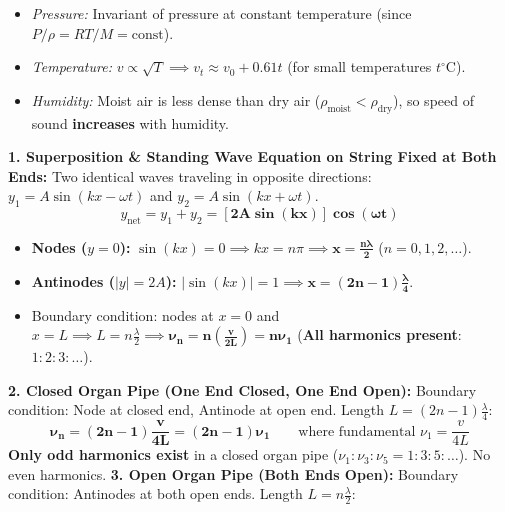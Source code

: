 \documentclass[10pt,a4paper]{article}
\begin{document}
\begin{formulabox}
\begin{itemize}
  \begin{itemize}
    \item \textit{Pressure:} Invariant of pressure at constant temperature (since $P/\rho = RT/M = \text{const}$).
    \item \textit{Temperature:} $v \propto \sqrt{T} \implies v_t \approx v_0 + 0.61 t$ (for small temperatures $t^\circ\mathrm{C}$).
    \item \textit{Humidity:} Moist air is less dense than dry air ($\rho_{\text{moist}} < \rho_{\text{dry}}$), so speed of sound \textbf{increases} with humidity.
  \end{itemize}
\end{itemize}
\end{formulabox}

\begin{formulabox}
\textbf{1. Superposition \& Standing Wave Equation on String Fixed at Both Ends:}
Two identical waves traveling in opposite directions: $y_1 = A\sin(kx - \omega t)$ and $y_2 = A\sin(kx + \omega t)$.
\begin{equation}
  y_{\text{net}} = y_1 + y_2 = \mathbf{[2A \sin(kx)] \cos(\omega t)}
\end{equation}
\begin{itemize}
  \item \textbf{Nodes ($y=0$):} $\sin(kx) = 0 \implies kx = n\pi \implies \mathbf{x = \frac{n\lambda}{2}}$ ($n = 0, 1, 2, \dots$).
  \item \textbf{Antinodes ($|y|=2A$):} $|\sin(kx)| = 1 \implies \mathbf{x = (2n-1)\frac{\lambda}{4}}$.
  \item Boundary condition: nodes at $x = 0$ and $x = L \implies L = n\frac{\lambda}{2} \implies \mathbf{\nu_n = n \left(\frac{v}{2L}\right) = n \nu_1}$ (\textbf{All harmonics present}: $1 : 2 : 3 : \dots$).
\end{itemize}
\textbf{2. Closed Organ Pipe (One End Closed, One End Open):}
Boundary condition: Node at closed end, Antinode at open end. Length $L = (2n-1)\frac{\lambda}{4}$:
\begin{equation}
  \mathbf{\nu_n = (2n-1)\frac{v}{4L} = (2n-1)\nu_1} \qquad \text{where fundamental } \nu_1 = \frac{v}{4L}
\end{equation}
\textbf{Only odd harmonics exist} in a closed organ pipe ($\nu_1 : \nu_3 : \nu_5 = 1 : 3 : 5 : \dots$). No even harmonics.
\textbf{3. Open Organ Pipe (Both Ends Open):}
Boundary condition: Antinodes at both open ends. Length $L = n\frac{\lambda}{2}$:

\end{formulabox}
\end{document}
